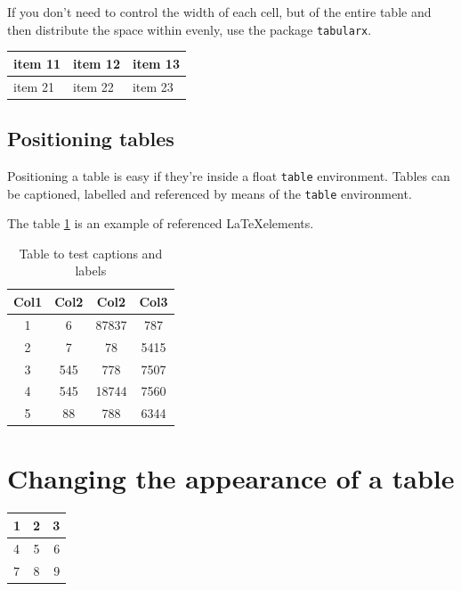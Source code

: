 \documentclass[letterpaper,dvipsnames]{article}
\begin{document}
If you don't need to control the width of each cell, but of the entire table and then 
distribute the space within evenly, use the package \verb+tabularx+.

\begin{tabularx}{0.8\textwidth} { 
    | >{\raggedright\arraybackslash}X 
    | >{\centering\arraybackslash}X 
    | >{\raggedleft\arraybackslash}X | }
   \hline
   item 11 & item 12 & item 13 \\
   \hline
   item 21  & item 22  & item 23  \\
  \hline
\end{tabularx}

\subsection{Positioning tables}

Positioning a table is easy if they're inside a float \verb+table+ environment. 
Tables can be captioned, labelled and referenced by means of the \verb+table+ environment.

The table \ref{table:1} is an example of referenced \LaTeX elements.

\begin{table}[h!]
\centering
\begin{tabular}{||c c c c||} 
 \hline
 Col1 & Col2 & Col2 & Col3 \\ [0.5ex] 
 \hline\hline
 1 & 6 & 87837 & 787 \\ 
 2 & 7 & 78 & 5415 \\
 3 & 545 & 778 & 7507 \\
 4 & 545 & 18744 & 7560 \\
 5 & 88 & 788 & 6344 \\ [1ex] 
 \hline
\end{tabular}
\caption{Table to test captions and labels}
\label{table:1}
\end{table}
\clearpage

\section{Changing the appearance of a table}

\begin{center}
\begin{tabular}{ l c r }
    \hline
    \multicolumn{1}{|l}{1} & 2 & 3 \\ \hline
    4 & 5 & \multicolumn{1}{r|}{6}  \\ \hline
    \multicolumn{1}{|l}{7} & 8 & 9 \\ \hline
\end{tabular}
\end{center}
\end{document}
